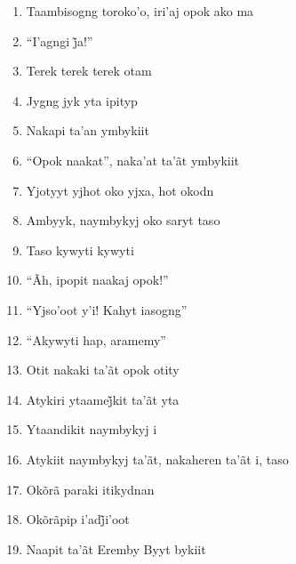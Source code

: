 \begin{enumerate}
 \item Taambisogng toroko'o, iri'aj opok ako ma

 \item ``I’agngi j̃a!''

 \begin{center}\end{center}

 \item Terek terek terek otam

 \item Jygng jyk yta ipityp

 \item Nakapi ta'an ymbykiit

 \item ``Opok naakat'', naka'at ta'ãt ymbykiit

 \begin{center}\end{center}

 \item Yjotyyt yjhot oko yjxa, hot okodn

 \item Ambyyk, naymbykyj oko saryt taso

 \item Taso kywyti kywyti

 \item ``Ãh, ipopit naakaj opok!''

 \item ``Yjso'oot y'i! Kahyt iasogng''

 \item ``Akywyti hap, aramemy''

 \item Otit nakaki ta'ãt opok otity

 \item Atykiri ytaamej̃kit ta’ãt yta

 \item Ytaandikit naymbykyj i

 \begin{center}\end{center}

 \item Atykiit naymbykyj ta'ãt, nakaheren ta'ãt i, taso

 \item Okõrã paraki itikydnan

 \item Okõrãpip i’adj̃i’oot 

 \item Naapit ta'ãt Eremby Byyt bykiit


\end{enumerate}
